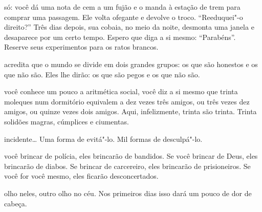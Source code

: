 \bigskip
\bigskip

 só: você dá uma nota de cem a um fujão e o manda à estação de trem
para comprar uma passagem. Ele volta ofegante e devolve o troco.
``Reeduquei"-o direito?'' Três dias depois, sua cobaia, no meio da noite,
desmonta uma janela e desaparece por um certo tempo. Espero que diga a
si mesmo: ``Parabéns''. Reserve seus experimentos para os ratos brancos.

\bigskip
\bigskip

 acredita que o mundo se divide em dois grandes grupos: os que são
honestos e os que não são. Eles lhe dirão: os que são pegos e os que não
são.

\bigskip
\bigskip

 você conhece um pouco a aritmética social, você diz a si mesmo que
trinta moleques num dormitório equivalem a dez vezes três amigos, ou
três vezes dez amigos, ou quinze vezes dois amigos. Aqui, infelizmente,
trinta são trinta. Trinta solidões magras, cúmplices e ciumentas.

\bigskip
\bigskip


 incidente\ldots{} Uma forma de evitá"-lo. Mil formas de desculpá"-lo.

\bigskip
\bigskip

 você brincar de polícia, eles brincarão de bandidos. Se você brincar
de Deus, eles brincarão de diabos. Se brincar de carcereiro, eles
brincarão de prisioneiros. Se você for você mesmo, eles ficarão
desconcertados.

\bigskip
\bigskip

 olho neles, outro olho no céu. Nos primeiros dias isso dará um pouco
de dor de cabeça.

\bigskip
\bigskip

\pagebreak
\thispagestyle{empty}

